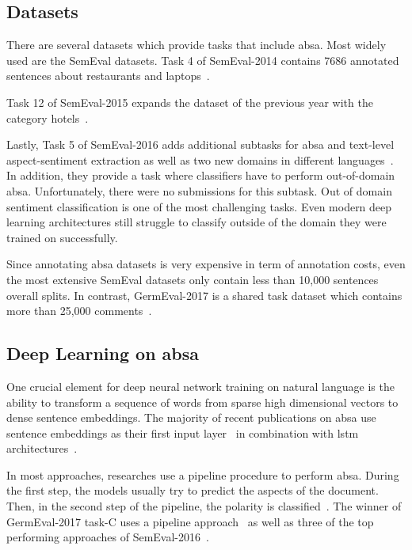 \subsection{Datasets}

There are several datasets which provide tasks that include \gls{absa}. Most widely used are the SemEval datasets. Task 4 of SemEval-2014 contains 7686 annotated sentences about restaurants and laptops~\cite{Pontiki2014}. 

Task 12 of SemEval-2015 expands the dataset of the previous year with the category hotels~\cite{Pontiki2015a}. 

Lastly, Task 5 of SemEval-2016 adds additional subtasks for \gls{absa} and text-level aspect-sentiment extraction as well as two new domains in different languages~\cite{Pontiki2015a}. In addition, they provide a task where classifiers have to perform out-of-domain \gls{absa}. Unfortunately, there were no submissions for this subtask. Out of domain sentiment classification is one of the most challenging tasks. Even modern deep learning architectures still struggle to classify outside of the domain they were trained on successfully.
\medskip

Since annotating \gls{absa} datasets is very expensive in term of annotation costs, even the most extensive SemEval datasets only contain less than 10,000 sentences overall splits. In contrast, GermEval-2017 is a shared task dataset which contains more than 25,000 comments~\cite{Wojatzki2017}.  

\subsection{Deep Learning on \gls{absa}}

One crucial element for deep neural network training on natural language is the ability to transform a sequence of words from sparse high dimensional vectors to dense sentence embeddings. The majority of recent publications on \gls{absa} use sentence embeddings as their first input layer~\cite{Ruder2016, Tang2016, Lee2017, Schmitt2018, Ma2018, Xue2018} in combination with \gls{lstm} architectures~\cite{Ruder2016, Tang2016, Ma2018}.
\medskip

In most approaches, researches use a pipeline procedure to perform \gls{absa}. During the first step, the models usually try to predict the aspects of the document. Then, in the second step of the pipeline, the polarity is classified~\cite{Lakkaraju2014}. The winner of GermEval-2017 task-C uses a pipeline approach~\cite{Lee2017} as well as three of the top performing approaches of SemEval-2016~\cite{Brun2016, Kumar2016, Xenos2016}.
\medskip

